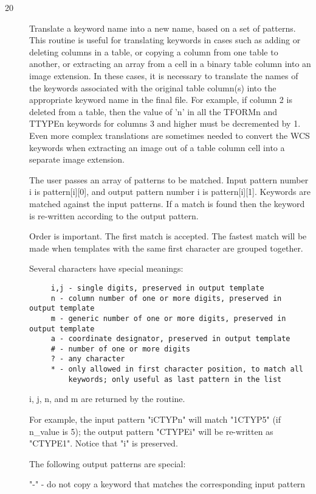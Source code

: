 \documentclass[11pt]{book}
\begin{document}
\begin{description}
\item[20]  Translate a keyword name into a new name, based on a set of patterns.
This routine is useful for translating keywords in cases such as
adding or deleting columns in
a table, or copying a column from one table to another, or extracting
an array from a cell in a binary table column into an image extension.  In
these cases, it is necessary to translate the names of the keywords associated
with the original table column(s) into the appropriate keyword name in the final
file.  For example, if column 2 is deleted from a table,
then the value of 'n' in all the
TFORMn and TTYPEn keywords for columns 3 and higher must be decremented
by 1.  Even more complex translations are sometimes needed to convert the
WCS keywords when extracting an image out of a table column cell into
a separate image extension.

The user passes an array of patterns to be matched.  Input pattern
number i is pattern[i][0], and output pattern number i is
pattern[i][1].  Keywords are matched against the input patterns.  If a
match is found then the keyword is re-written according to the output
pattern.

Order is important.  The first match is accepted.  The fastest match
will be made when templates with the same first character are grouped
together.

Several characters have special meanings:

\begin{verbatim}
     i,j - single digits, preserved in output template
     n - column number of one or more digits, preserved in output template
     m - generic number of one or more digits, preserved in output template
     a - coordinate designator, preserved in output template
     # - number of one or more digits
     ? - any character
     * - only allowed in first character position, to match all
         keywords; only useful as last pattern in the list
\end{verbatim}
i, j, n, and m are returned by the routine.

For example, the input pattern "iCTYPn" will match "1CTYP5" (if n\_value
is 5); the output pattern "CTYPEi" will be re-written as "CTYPE1".
Notice that "i" is preserved.

The following output patterns are special:

    "-" - do not copy a keyword that matches the corresponding input pattern


\end{description}
\end{document}
